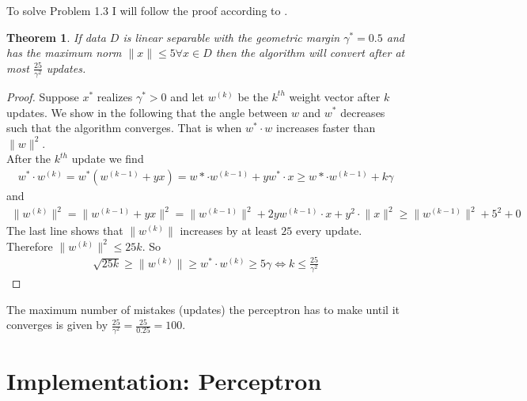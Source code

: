 \documentclass[12pt]{article}
\newtheorem{theorem}{Theorem}[section]
\begin{document}
\noindent
To solve Problem 1.3 I will follow the proof according to \cite{CIML}. 
\begin{theorem}
	If data $D$ is linear separable with the geometric margin $\gamma^* = 0.5$ and has the maximum norm $\lVert x \rVert\leq 5 \forall x \in D$ then the algorithm will convert after at most $\frac{25}{\gamma^2}$ updates. 
\end{theorem}
\begin{proof}
	Suppose $x^*$ realizes $\gamma^*>0$ and let $w^{(k)}$ be the $k^{th}$ weight vector after $k$ updates. We show in the following that the angle between $w$ and $w^*$ decreases such that the algorithm converges. That is when $w^*\cdot w$ increases faster than $\lVert w \rVert^2$.\\
	After the $k^{th}$ update we find
	\begin{align*}
		w^*\cdot w^{(k)} = w^{*}\left( w^{(k-1)}+yx \right) = w*\cdot w^{(k-1)} + yw^*\cdot x \geq w*\cdot w^{(k-1)} + k\gamma 
	\end{align*}
	and
	\begin{align*}
		\lVert w^{(k)} \rVert^2=\lVert w^{(k-1)} + yx \rVert^2 = \lVert w^{(k-1)} \rVert^2 + 2yw^{(k-1)}\cdot x + y^2\cdot\lVert x \rVert^2 \geq \lVert w^{(k-1)} \rVert^2 +5^2 +0
	\end{align*}
	The last line shows that $\lVert w^{(k)} \rVert$ increases by at least $25$ every update. Therefore $\lVert w^{(k)} \rVert^2 \leq 25k$. So
	\begin{align*}
	\sqrt{25k} \geq \lVert w^{(k)} \rVert \geq w^*\cdot w^{(k)} \geq 5\gamma \Leftrightarrow k \leq \frac{25}{\gamma^2}
	\end{align*}
\end{proof}
\noindent
The maximum number of mistakes (updates) the perceptron has to make until it converges is given by $\frac{25}{\gamma^2}=\frac{25}{0.25}=100$.

\newpage

\section{Implementation: Perceptron}
\end{document}
